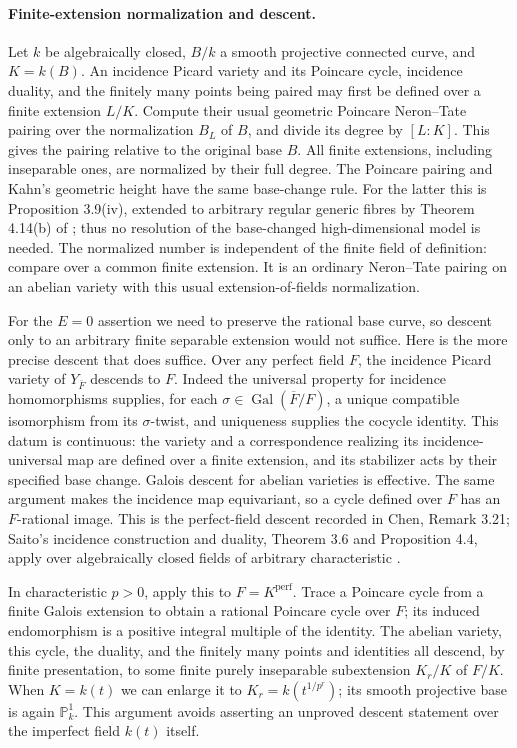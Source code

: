 \paragraph{Finite-extension normalization and descent.}
Let $k$ be algebraically closed, $B/k$ a smooth projective connected
curve, and $K=k(B)$.  An incidence Picard variety and its Poincare
cycle, incidence duality, and the finitely many points being paired
may first be defined over a finite extension $L/K$.  Compute their
usual geometric Poincare Neron--Tate pairing over the normalization
$B_L$ of $B$, and divide its degree by $[L:K]$.  This gives the
pairing relative to the original base $B$.  All finite extensions,
including inseparable ones, are normalized by their full degree.
The Poincare pairing and Kahn's geometric height have the same
base-change rule.  For the latter this is Proposition 3.9(iv),
extended to arbitrary regular generic fibres by Theorem 4.14(b)
of \cite{KahnHeight2024}; thus no resolution of the base-changed
high-dimensional model is needed.  The normalized number is
independent of the finite field of definition: compare over a
common finite extension.  It is an ordinary Neron--Tate pairing
on an abelian variety with this usual extension-of-fields
normalization.

For the $E=0$ assertion we need to preserve the rational base curve,
so descent only to an arbitrary finite separable extension would
not suffice.  Here is the more precise descent that does suffice.
Over any perfect field $F$, the incidence Picard variety of
$Y_{\overline F}$ descends to $F$.  Indeed the universal property
for incidence homomorphisms supplies, for each
$\sigma\in\operatorname{Gal}(\overline F/F)$, a unique compatible
isomorphism from its $\sigma$-twist, and uniqueness supplies the
cocycle identity.  This datum is continuous: the variety and a
correspondence realizing its incidence-universal map are defined
over a finite extension, and its stabilizer acts by their specified
base change.  Galois descent for abelian varieties is effective.
The same argument makes the incidence map equivariant, so a cycle
defined over $F$ has an $F$-rational image.  This is the
perfect-field descent recorded in Chen, Remark 3.21; Saito's
incidence construction and duality, Theorem 3.6 and Proposition 4.4,
apply over algebraically closed fields of arbitrary characteristic
\cite{SaitoPicard1979}.

In characteristic $p>0$, apply this to
$F=K^{\mathrm{perf}}$.  Trace a Poincare cycle from a finite Galois
extension to obtain a rational Poincare cycle over $F$; its induced
endomorphism is a positive integral multiple of the identity.
The abelian variety, this cycle, the duality, and the finitely many
points and identities all descend, by finite presentation, to some
finite purely inseparable subextension $K_r/K$ of $F/K$.
When $K=k(t)$ we can enlarge it to
$K_r=k(t^{1/p^r})$; its smooth projective base is again
$\mathbb P^1_k$.  This argument avoids asserting an unproved
descent statement over the imperfect field $k(t)$ itself.

